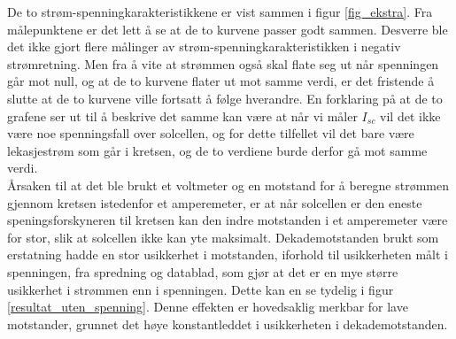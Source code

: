 \documentclass[%
 reprint,
 amsmath,amssymb,
 aps,
 norsk,
 booktabs
]{revtex4-1}
\begin{document}
De to strøm-spenningkarakteristikkene er vist sammen i figur \vref{fig_ekstra}. Fra målepunktene er det lett å se at de to kurvene passer godt sammen. Desverre ble det ikke gjort flere målinger av strøm-spenningkarakteristikken i negativ strømretning. Men fra å vite at strømmen også skal flate seg ut når spenningen går mot null, og at de to kurvene flater ut mot samme verdi, er det fristende å slutte at de to kurvene ville fortsatt å følge hverandre. En forklaring på at de  to grafene ser ut til å beskrive det samme kan være at når vi måler $I_{sc}$ vil det ikke være noe spenningsfall over solcellen, og for dette tilfellet vil det bare være lekasjestrøm som går i kretsen, og de to verdiene burde derfor gå mot samme verdi. \\
Årsaken til at det ble brukt et voltmeter og en motstand for å beregne strømmen gjennom kretsen istedenfor et amperemeter, er at når solcellen er den eneste speningsforskyneren til kretsen kan den indre motstanden i et amperemeter være for stor, slik at solcellen ikke kan yte maksimalt. Dekademotstanden brukt som erstatning hadde en stor usikkerhet i motstanden, iforhold til usikkerheten målt i spenningen, fra spredning og datablad, som gjør at det er en mye større usikkerhet i strømmen enn i spenningen. Dette kan en se tydelig i figur \vref{resultat_uten_spenning}. Denne effekten er hovedsaklig merkbar for lave motstander, grunnet det høye konstantleddet i usikkerheten i dekademotstanden.
\end{document}
